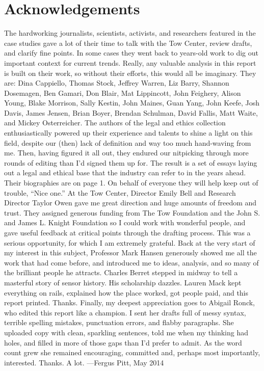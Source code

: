 \chapter{Acknowledgements}
The hardworking journalists, scientists, activists, and researchers featured in the
case studies gave a lot of their time to talk with the Tow Center, review drafts, and
clarify fine points. In some cases they went back to years-old work to dig out important
context for current trends. Really, any valuable analysis in this report is built on
their work, so without their efforts, this would all be imaginary. They are: Dina Cappiello,
Thomas Stock, Jeffrey Warren, Liz Barry, Shannon Dosemagen, Ben Gamari,
Don Blair, Mat Lippincott, John Feighery, Alison Young, Blake Morrison, Sally Kestin,
John Maines, Guan Yang, John Keefe, Josh Davis, James Jensen, Brian Boyer,
Brendan Schulman, David Fallis, Matt Waite, and Mickey Osterreicher.
The authors of the legal and ethics collection enthusiastically powered up their experience
and talents to shine a light on this field, despite our (then) lack of definition
and way too much hand-waving from me. Then, having figured it all out, they
endured our nitpicking through more rounds of editing than I'd signed them up for.
The result is a set of essays laying out a legal and ethical base that the industry can
refer to in the years ahead. Their biographies are on page 1. On behalf of everyone
they will help keep out of trouble, ``Nice one.''
At the Tow Center, Director Emily Bell and Research Director Taylor Owen gave me
great direction and huge amounts of freedom and trust. They assigned generous funding
from The Tow Foundation and the John S. and James L. Knight Foundation so I
could work with wonderful people, and gave useful feedback at critical points through
the drafting process. This was a serious opportunity, for which I am extremely grateful.
Back at the very start of my interest in this subject, Professor Mark Hansen generously
showed me all the work that had come before, and introduced me to ideas,
analysis, and so many of the brilliant people he attracts. Charles Berret stepped in
midway to tell a masterful story of sensor history. His scholarship dazzles. Lauren
Mack kept everything on rails, explained how the place worked, got people paid, and
this report printed. Thanks.
Finally, my deepest appreciation goes to Abigail Ronck, who edited this report like a
champion. I sent her drafts full of messy syntax, terrible spelling mistakes, punctuation
errors, and flabby paragraphs. She uploaded copy with clean, sparkling sentences,
told me when my thinking had holes, and filled in more of those gaps than I'd
prefer to admit. As the word count grew she remained encouraging, committed and,
perhaps most importantly, interested.
Thanks. A lot.
—Fergus Pitt, May 2014




